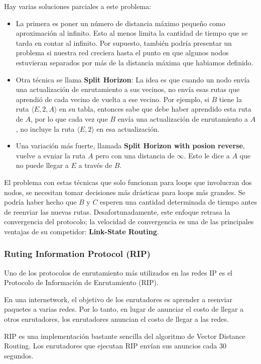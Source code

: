 Hay varias soluciones parciales a este problema:
\begin{itemize}
  \item La primera es poner un número de distancia máximo pequeño como aproximación al infinito. Esto al menos limita la cantidad de tiempo que se tarda en contar al infinito. Por supuesto, también podría presentar un problema si nuestra red creciera hasta el punto en que algunos nodos estuvieran separados por más de la distancia máxima que habiamos definido.
  \item Otra técnica se llama \textbf{Split Horizon}: La idea es que cuando un nodo envía una actualización de enrutamiento a sus vecinos, no envía esas rutas que aprendió de cada vecino de vuelta a ese vecino. Por ejemplo, si \(B\) tiene la ruta \(\langle E, 2, A\rangle\) en su tabla, entonces sabe que debe haber aprendido esta ruta de \(A\), por lo que cada vez que \(B\) envía una actualización de enrutamiento a \(A\), no incluye la ruta \(\langle E, 2\rangle\) en esa actualización.
  \item Una variación más fuerte, llamada \textbf{Split Horizon with posion reverse}, vuelve a evniar la ruta \(A\) pero con una distancia de \(\infty\). Esto le dice a \(A\) que no puede llegar a \(E\) a través de \(B\).
\end{itemize}

El problema con estas técnicas que solo funcionan para loops que involucran dos nodos, se necesitan tomar decisiones más drásticas para loops más grandes. Se podría haber hecho que \(B\) y \(C\) esperen una cantidad determinada de tiempo antes de reenviar las nuevas rutas. Desafortunadamente, este enfoque retrasa la convergencia del protocolo; la velocidad de convergencia es una de las principales ventajas de su competidor: \textbf{Link-State Routing}.

\subsubsection*{Ruting Information Protocol (RIP)}
Uno de los protocolos de enrutamiento más utilizados en las redes IP es el Protocolo de Información de Enrutamiento (RIP).

En una internetwork, el objetivo de los enrutadores es aprender a reenviar paquetes a varias redes. Por lo tanto, en lugar de anunciar el costo de llegar a otros enrutadores, los enrutadores anuncian el costo de llegar a las redes.

RIP es una implementación bastante sencilla del algoritmo de Vector Distance Routing. Los enrutadores que ejecutan RIP envían sus anuncios cada 30 segundos.

